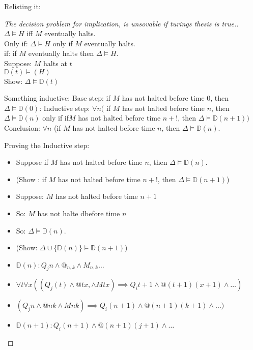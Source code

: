 Relisting it: 
\begin{proof}[The decision problem for implication, is unsovable if turings thesis is true.]
$\Delta \vDash H$ iff $M$ eventually halts. \\
Only if: $\Delta \vDash H$ only if $M$ eventually halts. \\
if: if $M$ eventually halts then $\Delta \vDash H$. \\
Suppose: $M$ halts at $t$\\
$\mathbb{D}(t) \vDash(H)$ \\ %
Show: $\Delta \vDash \mathbb{D}(t)$

Something inductive:
Base step: if $M$ has not halted before time 0, then $\Delta \vDash \mathbb{D}(0)$:
Inductive step: $\forall n ($ if $M$ has not halted before time $n$, then $\Delta \vDash \mathbb{D}(n)$ only if if$M$ has not halted before time $n+!$, then $\Delta \vDash \mathbb{D}(n+1))$
Conclusion: $\forall n$ (if $M$  has not halted before time $n$, then $\Delta \vDash \mathbb{D}(n)$.

Proving the Inductive step: \\
\begin{itemize}
\item Suppose if $M$ has not halted before time $n$, then $\Delta \vDash \mathbb{D}(n)$.
\item (Show : if $M$ has not halted before time $n+!$, then $\Delta \vDash \mathbb{D}(n+1)$)
\item Suppose: $M$ has not halted before time $n+1$
\item So: $M$ has not halte dbefore time $n$
\item So: $\Delta \vDash \mathbb{D}(n)$.
\item (Show: $\Delta \cup \{\mathbb{D}(n)\} \vDash \mathbb{D}(n+1))$
\item $\mathbb{D}(n): Q_jn \wedge @_{n,k} \wedge M_{n,k} \dots$
\item $\forall t \forall x ((Q_j(t) \wedge @tx, \wedge Mtx) \implies Q_it+1 \wedge @(t+1)(x+1) \wedge \dots)$
\item $(Q_jn \wedge @nk \wedge Mnk) \implies Q_i(n+1) \wedge @(n+1)(k+1) \wedge \dots)$
\item $\mathbb{D}(n+1): Q_i(n+1) \wedge @(n+1)(j+1)\wedge \dots$
\end{itemize}

\end{proof}

